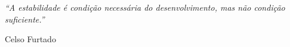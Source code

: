 \cleardoublepage
\thispagestyle{empty}

\vspace*{0.85\textheight}

\hfill
\begin{minipage}{0.45\textwidth}
\begin{flushright}

\textit{
``A estabilidade é condição necessária do desenvolvimento, mas não condição suficiente.''
}

\vspace{0.5cm}

Celso Furtado

\end{flushright}
\end{minipage}

\clearpage